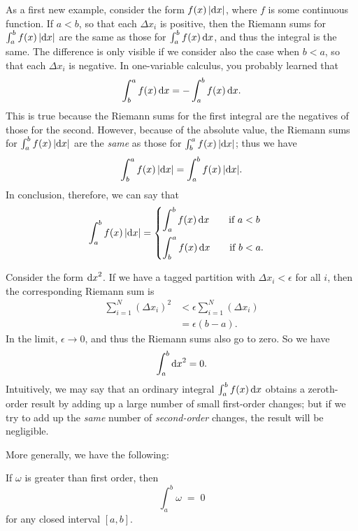 \documentclass[12pt]{amsart}
\begin{document}
\begin{eg}\label{eg:onevar-absint}
  As a first new example, consider the form $f(x) \, |{\mathrm{d} x}|$, where $f$ is some continuous function.
  If $a<b$, so that each $\Delta x_i$ is positive, then the Riemann sums for $\int_a^b f(x) \, |{\mathrm{d} x}|$ are the same as those for $\int_a^b f(x) \, {\mathrm{d} x}$, and thus the integral is the same.
  The difference is only visible if we consider also the case when $b<a$, so that each $\Delta x_i$ is negative.
  In one-variable calculus, you probably learned that
  \[ \int_b^a f(x)\,{\mathrm{d} x} = - \int_a^b f(x) \,{\mathrm{d} x}. \]
  This is true because the Riemann sums for the first integral are the negatives of those for the second.
  However, because of the absolute value, the Riemann sums for $\int_a^b f(x) \, |{\mathrm{d} x}|$ are the \emph{same} as those for $\int_b^a f(x) \, |{\mathrm{d} x}|$; thus we have
  \[ \int_b^a f(x)\,|{\mathrm{d} x}| = \int_a^b f(x) \,|{\mathrm{d} x}|. \]
  In conclusion, therefore, we can say that
  \begin{equation}
    \int_a^b f(x) \,|{\mathrm{d} x}| =
    \begin{cases}
      \displaystyle\int_a^b f(x) \,{\mathrm{d} x} \qquad\text{if } a<b\\[10pt]
      \displaystyle\int_b^a f(x) \,{\mathrm{d} x} \qquad\text{if } b<a.
    \end{cases}\label{eq:onevar-absint}
  \end{equation}
\end{eg}

\begin{eg}
  Consider the form ${\mathrm{d} x}^2$.
  If we have a tagged partition with $\Delta x_i < \epsilon$ for all $i$, then the corresponding Riemann sum is
  \begin{align*}
    \sum_{i=1}^N (\Delta x_i)^2 &< \epsilon \sum_{i=1}^N (\Delta x_i)\\
    &= \epsilon (b-a).
  \end{align*}
  In the limit, $\epsilon \to 0$, and thus the Riemann sums also go to zero.
  So we have
  \[ \int_a^b {\mathrm{d} x}^2 = 0. \]
  Intuitively, we may say that an ordinary integral $\int_a^b f(x) \,{\mathrm{d} x}$ obtains a zeroth-order result by adding up a large number of small first-order changes; but if we try to add up the \emph{same} number of \emph{second-order} changes, the result will be negligible.
\end{eg}

More generally, we have the following:

\begin{thm}\label{thm:int-gtfirstorder-onevar}
  If $\omega$ is greater than first order, then
  \[ \int_a^b \omega \;=\; 0\]
  for any closed interval $[a,b]$.
\end{thm}
\end{document}
